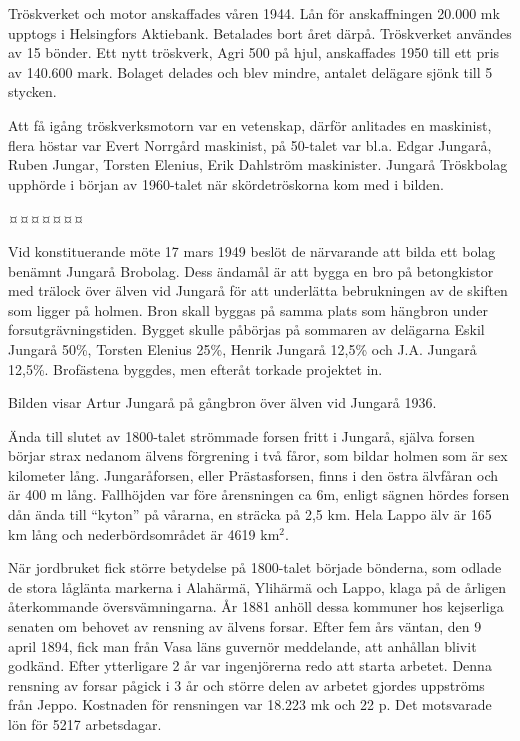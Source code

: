 Tröskverket och motor anskaffades våren 1944. Lån för anskaffningen 20.000 mk upptogs i Helsingfors Aktiebank. Betalades bort året därpå. Tröskverket användes av 15 bönder. Ett nytt tröskverk, Agri 500 på hjul, anskaffades 1950 till ett pris av 140.600 mark. Bolaget delades och blev mindre, antalet delägare sjönk till 5 stycken.

Att få igång tröskverksmotorn var en vetenskap, därför anlitades en maskinist, flera höstar var Evert Norrgård maskinist, på 50-talet var bl.a. Edgar Jungarå, Ruben Jungar, Torsten Elenius, Erik Dahlström maskinister.
Jungarå Tröskbolag upphörde i början av 1960-talet när skördetröskorna kom med i bilden.

                                    ¤¤¤¤¤¤¤



Vid konstituerande möte 17 mars 1949 beslöt de närvarande att bilda ett bolag benämnt Jungarå Brobolag. Dess ändamål är att bygga en bro på betongkistor med trälock över älven vid Jungarå för att underlätta 		       bebrukningen av de skiften som ligger på holmen. Bron skall byggas på samma plats som hängbron under 		       forsutgrävningstiden. Bygget skulle påbörjas på sommaren av delägarna Eskil Jungarå 50\%, Torsten Elenius 25\%, Henrik Jungarå 12,5\% och J.A. Jungarå 12,5\%. Brofästena byggdes, men efteråt torkade projektet in.

Bilden visar Artur Jungarå på gångbron över älven vid Jungarå 1936.





Ända till slutet av 1800-talet strömmade forsen fritt i Jungarå, själva forsen börjar strax nedanom älvens förgrening i två fåror, som bildar holmen som är sex kilometer lång. Jungaråforsen, eller Prästasforsen, finns i den östra älvfåran och är 400 m lång. Fallhöjden var före årensningen ca 6m, enligt sägnen hördes forsen dån ända till ``kyton'' på vårarna, en  sträcka på 	2,5 km. Hela Lappo älv är 165 km lång och nederbördsområdet 	är 4619 km$^2$.

När jordbruket fick större betydelse på 1800-talet började bönderna, som odlade de stora låglänta markerna i Alahärmä, Ylihärmä och Lappo, klaga på de årligen återkommande översvämningarna. År 1881 anhöll dessa kommuner hos kejserliga senaten om behovet av rensning av älvens forsar. Efter fem års väntan, den 9 april 1894, fick man från Vasa läns guvernör meddelande, att anhållan blivit godkänd. Efter ytterligare 2 år var ingenjörerna redo att starta arbetet. Denna rensning av forsar pågick i 3 år och större delen 	av arbetet gjordes uppströms från Jeppo. Kostnaden för rensningen var 18.223 mk och 22 p. Det motsvarade lön för 5217 	arbetsdagar.

